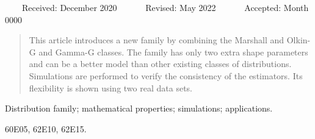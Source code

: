 \documentclass[twoside,leqno,11pt]{article}
\begin{document}

\maketitle
\setpagewiselinenumbers
\modulolinenumbers[1]
\linenumbers
\noindent
~~~~{\small{\sffamily Received:} December 2020 ~~~~~~{\sffamily Revised:} May 2022 ~~~~~~{\sffamily Accepted:} Month 0000}

\begin{abstract}
This article introduces a new family by combining the Marshall and Olkin-G and Gamma-G classes. The family has only two
extra shape parameters and can be a better model  than other existing classes of distributions. Simulations are performed to verify the
consistency of the estimators. Its flexibility is shown using two real data sets.
\end{abstract}

\begin{keywords}
 Distribution family;  mathematical properties; simulations; applications.
\end{keywords}

\begin{ams}
	60E05, 62E10, 62E15.
\end{ams}
\end{document}
